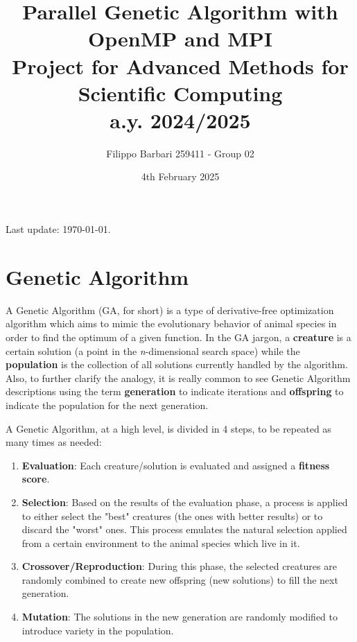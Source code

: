 \documentclass[12pt,a4paper,oneside]{article}
\title{%
	Parallel Genetic Algorithm with OpenMP and MPI \\
	\large Project for Advanced Methods for Scientific Computing \\
	a.y. 2024/2025}
\author{Filippo Barbari 259411 - Group 02}
\date{4th February 2025}
\begin{document}
	\maketitle
	
	\vfill
	\begin{center}
		\scriptsize
		Last update: \today.
	\end{center}
	\clearpage
	
	\tableofcontents
	\clearpage
	
	\section{Genetic Algorithm}
	A Genetic Algorithm (GA, for short) is a type of derivative-free optimization algorithm which aims to mimic the evolutionary behavior of animal species in order to find the optimum of a given function.
	In the GA jargon, a \textbf{creature} is a certain solution (a point in the \textit{n}-dimensional search space) while the \textbf{population} is the collection of all solutions currently handled by the algorithm. Also, to further clarify the analogy, it is really common to see Genetic Algorithm descriptions using the term \textbf{generation} to indicate iterations and \textbf{offspring} to indicate the population for the next generation.
	
	A Genetic Algorithm, at a high level, is divided in 4 steps, to be repeated as many times as needed:
	\begin{enumerate}
		\item \textbf{Evaluation}: Each creature/solution is evaluated and assigned a \textbf{fitness score}.

		\item \textbf{Selection}: Based on the results of the evaluation phase, a process is applied to either select the "best" creatures (the ones with better results) or to discard the "worst" ones. This process emulates the natural selection applied from a certain environment to the animal species which live in it.
		
		\item \textbf{Crossover/Reproduction}: During this phase, the selected creatures are randomly combined to create new offspring (new solutions) to fill the next generation.

		\item \textbf{Mutation}: The solutions in the new generation are randomly modified to introduce variety in the population.
	\end{enumerate}
\end{document}
